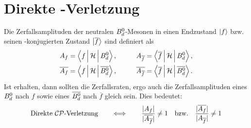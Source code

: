 \section{Direkte \CP-Verletzung}
Die Zerfallsamplituden der neutralen $\text{$B_d^0$}$-Mesonen in einen Endzustand $\Ket{f}$ bzw. seinen \CP-konjugierten Zustand $\Ket{\overline{f}}$ sind definiert als
\begin{alignat}{2}
\nonumber A_f &= \Braket{f|\mathcal{H}|\text{\Bd}\vphantom{\text{\Bdbar}}}, && \qquad A_{\overline{f}} = \Braket{\overline{f}|\mathcal{H}|\text{\Bd}\vphantom{\text{\Bdbar}}}, \\
          \overline{A_f} &= \Braket{f|\mathcal{H}|\text{\Bdbar}}, && \qquad  \overline{A_{\overline{f}}} = \Braket{\overline{f}|\mathcal{H}|\text{\Bdbar}}. \label{eq:decay_amplitudes}
\end{alignat}
Ist \CP erhalten, dann sollten die Zerfallsraten, ergo auch die Zerfallsamplituden eines $\text{$B_d^0$}$ nach $f$ sowie eines $\text{$\overline{B_d^0}$}$ nach $\overline{f}$ gleich sein. Dies bedeutet:
\begin{align}
\text{Direkte $\mathcal{CP}$-Verletzung} \qquad \Longleftrightarrow \qquad \frac{|A_f|}{|\overline{A_{\overline{f}}}|} \neq 1 \quad \text{bzw.} \quad \frac{|\overline{A_f}|}{|A_{\overline{f}}|} \neq 1
\end{align}


